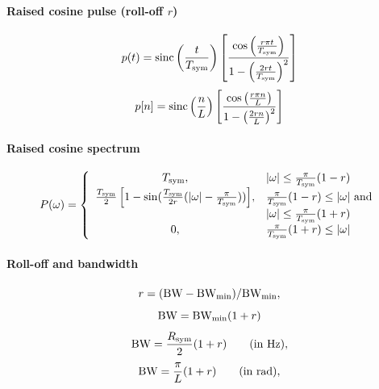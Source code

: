 \paragraph{Raised cosine pulse (roll-off $r$)}
\begin{equation}
p(t) = {\textrm{sinc}} \left( \frac{t}{{T_{\textrm{sym}}}} \right) \left[ \frac{\cos \left( \frac{r \pi t}{{T_{\textrm{sym}}}} \right) }{1 - \left( \frac{2 r t}{{T_{\textrm{sym}}}} \right)^2} \right]
\label{eq:raisedCosine}
\end{equation}
\begin{equation}
p[n] = {\textrm{sinc}} \left( \frac{n}{L} \right) \left[ \frac{\cos \left( \frac{r \pi n}{L} \right) }{1 - \left( \frac{2 r n}{L} \right)^2} \right]
\label{eq:raisedCosineDiscreteTime}
\end{equation}

\paragraph{Raised cosine spectrum}
\begin{equation}
P({\omega}) = \left\{ {
\begin{array}{cl}
{{T_{\textrm{sym}}},} & {\lvert{\omega}\rvert \le \frac{\pi}{{T_{\textrm{sym}}}}(1-r)} \\
{\frac{{T_{\textrm{sym}}}}{2}\left[1 - \sin(\frac{{T_{\textrm{sym}}}}{2r}(\lvert{\omega}\rvert-\frac{\pi}{{T_{\textrm{sym}}}})) \right]}, & {\frac{\pi}{{T_{\textrm{sym}}}}(1-r) \le \lvert{\omega}\rvert \text{ and}}\\
& {\lvert{\omega}\rvert\le \frac{\pi}{{T_{\textrm{sym}}}}(1+r)} \\
{0,} & {\frac{\pi}{{T_{\textrm{sym}}}}(1+r) \le \lvert{\omega}\rvert} \\
\end{array}
} \right.
\label{eq:raisedCosineSpectrum}
\end{equation}

\paragraph{Roll-off and bandwidth}
\[r=({\textrm{BW}}-{\textrm{BW}}_{\textrm{min}})/{\textrm{BW}}_{\textrm{min}},\]
\[
{\textrm{BW}}={\textrm{BW}}_{\textrm{min}} (1+r)
\]
\[{\textrm{BW}}=\frac{{R_{\textrm{sym}}}}{2} (1+r)~~~~~~\textrm{(in Hz)},\]
\[
{\textrm{BW}}= \frac{\pi}{L} (1+r) ~~~~~~\textrm{(in rad)},
\]

